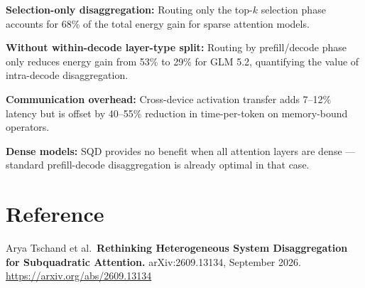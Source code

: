 \documentclass[10pt,twocolumn]{article}
\begin{document}
\textbf{Selection-only disaggregation:} Routing only the top-$k$
selection phase accounts for 68\% of the total energy gain for sparse
attention models.

\textbf{Without within-decode layer-type split:} Routing by
prefill/decode phase only reduces energy gain from 53\% to 29\% for
GLM 5.2, quantifying the value of intra-decode disaggregation.

\textbf{Communication overhead:} Cross-device activation transfer
adds 7--12\% latency but is offset by 40--55\% reduction in
time-per-token on memory-bound operators.

\textbf{Dense models:} SQD provides no benefit when all attention
layers are dense --- standard prefill-decode disaggregation is
already optimal in that case.

\section*{Reference}

Arya Tschand et al.\ \textbf{Rethinking Heterogeneous System
Disaggregation for Subquadratic Attention.}
arXiv:2609.13134, September 2026.
\url{https://arxiv.org/abs/2609.13134}
\end{document}
